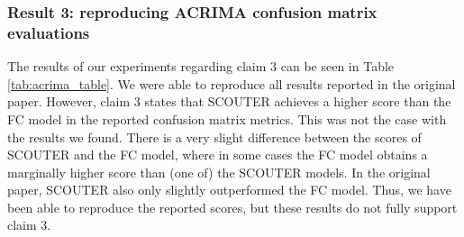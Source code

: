\begin{table}[!ht]
\centering
{}
\vspace{3mm}
\caption{Classification accuracy on various datasets. The original scores are reported in Table 3 in \cite{scouter} with ResNeSt-26 as backbone. Scores that diverge more than 0.05 from the original value are highlighted in orange. Where applicable, standard deviation is reported in parentheses.}
\label{tab:classification_table}
\end{table}

\subsubsection{Result 3: reproducing ACRIMA confusion matrix evaluations}
The results of our experiments regarding claim 3 can be seen in Table \ref{tab:acrima_table}. We were able to reproduce all results reported in the original paper. However, claim 3 states that SCOUTER achieves a higher score than the FC model in the reported confusion matrix metrics. This was not the case with the results we found. There is a very slight difference between the scores of SCOUTER and the FC model, where in some cases the FC model obtains a marginally higher score than (one of) the SCOUTER models. In the original paper, SCOUTER also only slightly outperformed the FC model. Thus, we have been able to reproduce the reported scores, but these results do not fully support claim 3. 

